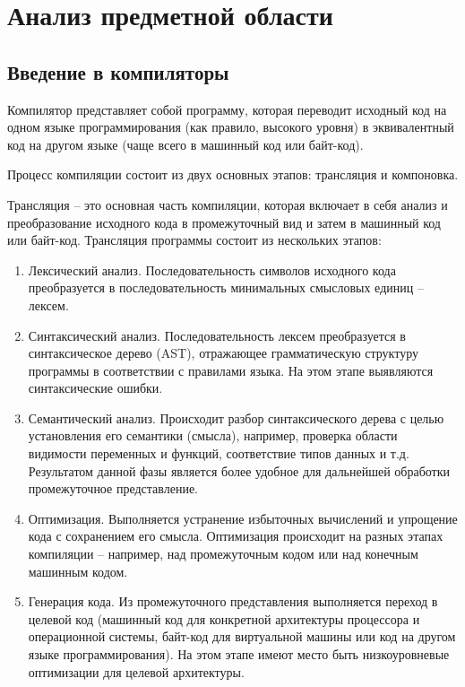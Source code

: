 \section{Анализ предметной области}

\subsection{Введение в компиляторы}

Компилятор представляет собой программу, которая переводит исходный код на одном языке программирования (как правило, высокого уровня) в эквивалентный код на другом языке (чаще всего в машинный код или байт-код).

Процесс компиляции состоит из двух основных этапов: трансляция и компоновка.

Трансляция -- это основная часть компиляции, которая включает в себя анализ и преобразование исходного кода в промежуточный вид и затем в машинный код или байт-код. Трансляция программы состоит из нескольких этапов:

\begin{enumerate}
\item Лексический анализ. Последовательность символов исходного кода преобразуется в последовательность минимальных смысловых единиц -- лексем.
\item Синтаксический анализ. Последовательность лексем преобразуется в синтаксическое дерево (AST), отражающее грамматическую структуру программы в соответствии с правилами языка. На этом этапе выявляются синтаксические ошибки.
\item Семантический анализ. Происходит разбор синтаксического дерева с целью установления его семантики (смысла), например, проверка области видимости переменных и функций, соответствие типов данных и т.д. Результатом данной фазы является более удобное для дальнейшей обработки промежуточное представление.
\item Оптимизация. Выполняется устранение избыточных вычислений и упрощение кода с сохранением его смысла. Оптимизация происходит на разных этапах компиляции -- например, над промежуточным кодом или над конечным машинным кодом.
\item Генерация кода. Из промежуточного представления выполняется переход в целевой код (машинный код для конкретной архитектуры процессора и операционной системы, байт-код для виртуальной машины или код на другом языке программирования). На этом этапе имеют место быть низкоуровневые оптимизации для целевой архитектуры.
\end{enumerate}


